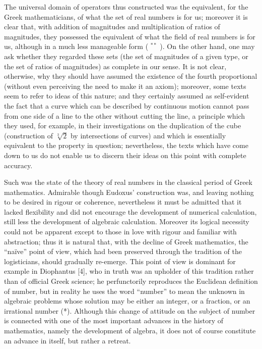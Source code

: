 The universal domain of operators thus constructed was the equivalent, for the Greek mathematicians, of what the set of real numbers is for us; moreover it is clear that, with addition of magnitudes and multiplication of ratios of magnitudes, they possessed the equivalent of what the field of real numbers is for us, although in a much less manageable form ( \(^{**}\) ). On the other hand, one may ask whether they regarded these sets (the set of magnitudes of a given type, or the set of ratios of magnitudes) as complete in our sense. It is not clear, otherwise, why they should have assumed the existence of the fourth proportional (without even perceiving the need to make it an axiom); moreover, some texts seem to refer to ideas of this nature; and they certainly assumed as self-evident the fact that a curve which can be described by continuous motion cannot pass from one side of a line to the other without cutting the line, a principle which they used, for example, in their investigations on the duplication of the cube (construction of \(\sqrt[3]{2}\) by intersections of curves) and which is essentially equivalent to the property in question; nevertheless, the texts which have come down to us do not enable us to discern their ideas on this point with complete accuracy.

Such was the state of the theory of real numbers in the classical period of Greek mathematics. Admirable though Eudoxus' construction was, and leaving nothing to be desired in rigour or coherence, nevertheless it must be admitted that it lacked flexibility and did not encourage the development of numerical calculation, still less the development of algebraic calculation. Moreover its logical necessity could not be apparent except to those in love with rigour and familiar with abstraction; thus it is natural that, with the decline of Greek mathematics, the ``naïve'' point of view, which had been preserved through the tradition of the logisticians, should gradually re-emerge. This point of view is dominant for example in Diophantus {[}4{]}, who in truth was an upholder of this tradition rather than of official Greek science; he perfunctorily reproduces the Euclidean definition of number, but in reality he uses the word ``number'' to mean the unknown in algebraic problems whose solution may be either an integer, or a fraction, or an irrational number (*). Although this change of attitude on the subject of number is connected with one of the most important advances in the history of mathematics, namely the development of algebra, it does not of course constitute an advance in itself, but rather a retreat.

